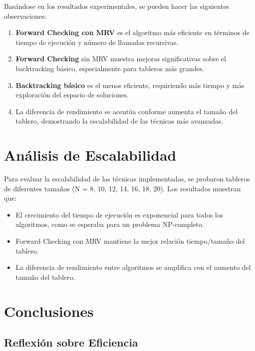 \documentclass[12pt,a4paper]{article}
\begin{document}
Basándose en los resultados experimentales, se pueden hacer las siguientes observaciones:

\begin{enumerate}
    \item \textbf{Forward Checking con MRV} es el algoritmo más eficiente en términos de tiempo de ejecución y número de llamadas recursivas.
    
    \item \textbf{Forward Checking} sin MRV muestra mejoras significativas sobre el backtracking básico, especialmente para tableros más grandes.
    
    \item \textbf{Backtracking básico} es el menos eficiente, requiriendo más tiempo y más exploración del espacio de soluciones.
    
    \item La diferencia de rendimiento se acentúa conforme aumenta el tamaño del tablero, demostrando la escalabilidad de las técnicas más avanzadas.
\end{enumerate}

\section{Análisis de Escalabilidad}

Para evaluar la escalabilidad de las técnicas implementadas, se probaron tableros de diferentes tamaños (N = 8, 10, 12, 14, 16, 18, 20). Los resultados muestran que:

\begin{itemize}
    \item El crecimiento del tiempo de ejecución es exponencial para todos los algoritmos, como se esperaba para un problema NP-completo.
    \item Forward Checking con MRV mantiene la mejor relación tiempo/tamaño del tablero.
    \item La diferencia de rendimiento entre algoritmos se amplifica con el aumento del tamaño del tablero.
\end{itemize}

\section{Conclusiones}

\subsection{Reflexión sobre Eficiencia}
\end{document}
